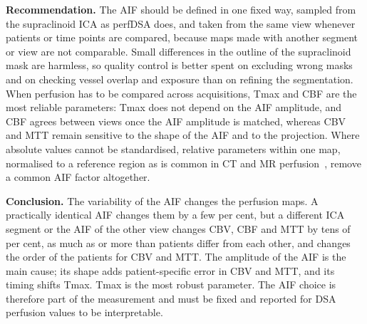 \textbf{Recommendation.} The AIF should be defined in one fixed way, sampled from the supraclinoid ICA as perfDSA
does, and taken from the same view whenever patients or time points are compared, because maps made with another
segment or view are not comparable. Small differences in the outline of the supraclinoid mask are harmless, so quality
control is better spent on excluding wrong masks and on checking vessel overlap and exposure than on refining the
segmentation. When perfusion has to be compared across acquisitions, Tmax and CBF are the most reliable parameters:
Tmax does not depend on the AIF amplitude, and CBF agrees between views once the AIF amplitude is matched, whereas CBV and
MTT remain sensitive to the shape of the AIF and to the projection. Where absolute values cannot be standardised, relative
parameters within one map, normalised to a reference region as is common in CT and MR
perfusion~\cite{copen2014,delarosa2023}, remove a common AIF factor altogether.

\textbf{Conclusion.} The variability of the AIF changes the perfusion maps. A practically identical AIF changes them by a
few per cent, but a different ICA segment or the AIF of the other view changes CBV, CBF and MTT by tens of per cent, as
much as or more than patients differ from each other, and changes the order of the patients for CBV and MTT. The amplitude
of the AIF is the main cause; its shape adds patient-specific error in CBV and MTT, and its timing shifts Tmax. Tmax is the
most robust parameter. The AIF choice is therefore part of the measurement and must be fixed and reported for DSA
perfusion values to be interpretable.
